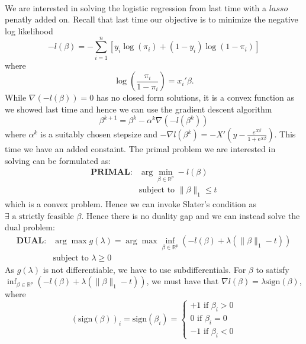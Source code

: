 \documentclass[12pt, leqno]{article}
\providecommand{\norm}[1]{\lVert#1\rVert}
\newcommand{\sign}{\mathrm{sign}}
\begin{document}
\paragraph{} We are interested in solving the
logistic regression from last time with a $lasso$ penatly added
on. Recall that last time our objective is to minimize the negative log likelihood 
\[
-l(\beta) = -\sum_{i=1}^{n} [y_i \log (\pi_i)+ (1-y_i) \log (1-\pi_i)]
\]
where 
\[
\log (\frac{\pi_i}{1-\pi_i}) = {x_i' \beta}.
\]
While $\nabla (-l(\beta)) = 0$ has no closed form solutions, it is a convex function as we
showed last time and hence we can use the gradient descent algorithm 
\[
\beta^{k+1} = \beta^{k} - \alpha^k \nabla (-l(\beta^k))
\]
where $\alpha^k$ is a suitably chosen stepsize and $-\nabla l(\beta^k) = -X'(y-\frac{e^{X \beta}}{1+e^{X
    \beta}})$.
This time we have an added constaint. The primal problem we are
interested in solving can be formulated as:
\begin{align*}
\textbf{PRIMAL:}&
\arg\min_{\beta \in \mathbb{R}^p} -l(\beta) \\
&\text{subject to } \norm{\beta}_1 \leq t
\end{align*}
which is a convex problem. Hence we can invoke Slater's condition as
$\exists \text{ a strictly feasible } \beta$. Hence there is no duality
gap and we can instead solve the dual problem:
\begin{align*}
\textbf{DUAL:}&
\arg\max g(\lambda) = \arg\max \inf_{\beta \in \mathbb{R}^p}(-l(\beta)+\lambda(\norm{\beta}_1-t)) \\
&\text{subject to } \lambda \geq 0
\end{align*}
As $g(\lambda)$ is not differentiable, we have to use
subdifferentials. For $\beta$ to satisfy $\inf_{\beta \in
  \mathbb{R}^p}(-l(\beta)+\lambda(\norm{\beta}_1-t))$, we must have
that $\nabla l(\beta) = \lambda \sign(\beta)$, where 
\[
(\sign(\beta))_i = \sign(\beta_i)  = \begin{cases} +1 \text { if }
  \beta_i>0 \\
0 \text { if }
  \beta_i=0 \\
-1 \text { if }
  \beta_i<0
\end{cases}
\] 
\end{document}
